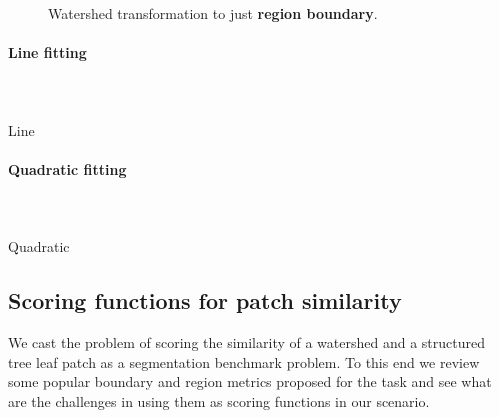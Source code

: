 \begin{figure}[ht!]
\begin{center}
\end{center}
\caption[Watershed transformation to just {\bf region boundary}]{Watershed transformation to just {\bf region boundary}.}
\label{fig:watershed-just-contour}
\end{figure}

\paragraph{Line fitting}\mbox{}\\\mbox{}\\
Line

\paragraph{Quadratic fitting}\mbox{}\\\mbox{}\\
Quadratic

\subsection{Scoring functions for patch similarity}
We cast the problem of scoring the similarity of a watershed and a structured tree leaf patch as a segmentation benchmark problem. To this end we review some popular boundary and region metrics proposed for the task and see what are the challenges in using them as scoring functions in our scenario.


